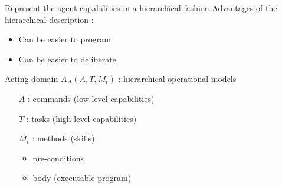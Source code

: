 \begin{frame}{Represent the agent capabilities in a hierarchical fashion}
Advantages of the hierarchical description : 
    \begin{itemize}
        \pause
        \item Can be easier to program
        \pause
        \item Can be easier to deliberate
    \end{itemize}
    Acting domain \textbf{$A_\Delta (A, T, M_t)$} : hierarchical operational models
    \small
    \pause
    \begin{itemize}
        \item[$A$] : commands (low-level capabilities)
        \pause
        \item[$T$] : tasks (high-level capabilities)
        \pause
        \item[$M_t$] : methods (skills):
        \begin{itemize}
            \item pre-conditions
            \item body (executable program)
        \end{itemize}
    \end{itemize}

    
\end{frame}



